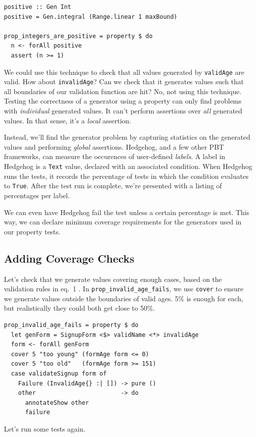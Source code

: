 \begin{verbatim}
positive :: Gen Int
positive = Gen.integral (Range.linear 1 maxBound)

prop_integers_are_positive = property $ do
  n <- forAll positive
  assert (n >= 1)
\end{verbatim}
We could use this technique to check that all values generated by
\texttt{validAge} are valid. How about \texttt{invalidAge}? Can we check
that it generates values such that all boundaries of our validation
function are hit? No, not using this technique. Testing the correctness
of a generator using a property can only find problems with
\emph{individual} generated values. It can't perform assertions over
\emph{all} generated values. In that sense, it's a \emph{local}
assertion.

Instead, we'll find the generator problem by capturing statistics on the
generated values and performing \emph{global} assertions. Hedgehog, and
a few other PBT frameworks, can measure the occurences of user-defined
\emph{labels}. A label in Hedgehog is a \texttt{Text} value, declared
with an associated condition. When Hedgehog runs the tests, it records
the percentage of tests in which the condition evaluates to
\texttt{True}. After the test run is complete, we're presented with a
listing of percentages per label.

We can even have Hedgehog fail the test unless a certain percentage is
met. This way, we can declare mininum coverage requirements for the
generators used in our property tests.

\subsection{Adding Coverage Checks}
\label{adding-coverage-checks}

Let's check that we generate values covering enough cases, based on the
validation rules in eq.~1 . In \texttt{prop\_invalid\_age\_fails}, we
use \texttt{cover} to ensure we generate values outside the boundaries
of valid ages. 5\% is enough for each, but realistically they could both
get close to 50\%.

\begin{verbatim}
prop_invalid_age_fails = property $ do
  let genForm = SignupForm <$> validName <*> invalidAge
  form <- forAll genForm
  cover 5 "too young" (formAge form <= 0)
  cover 5 "too old"   (formAge form >= 151)
  case validateSignup form of
    Failure (InvalidAge{} :| []) -> pure ()
    other                        -> do
      annotateShow other
      failure
\end{verbatim}
Let's run some tests again.

